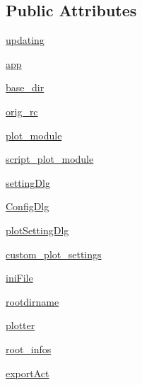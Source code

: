 \subsection*{Public Attributes}
\begin{DoxyCompactItemize}
\item 
\mbox{\hyperlink{classgetdist_1_1gui_1_1mainwindow_1_1MainWindow_aae95c1cdc2de48443e12249c96d75f23}{updating}}
\item 
\mbox{\hyperlink{classgetdist_1_1gui_1_1mainwindow_1_1MainWindow_a4d3a1d8d893ed8672986474f79ec7ed3}{app}}
\item 
\mbox{\hyperlink{classgetdist_1_1gui_1_1mainwindow_1_1MainWindow_a6ebfb6aab05c9138ae69b241cdb33e34}{base\+\_\+dir}}
\item 
\mbox{\hyperlink{classgetdist_1_1gui_1_1mainwindow_1_1MainWindow_aefc8a3ecef1f72721faba9e7bdeade71}{orig\+\_\+rc}}
\item 
\mbox{\hyperlink{classgetdist_1_1gui_1_1mainwindow_1_1MainWindow_ac741e8c4edb304ebe5892f4841195166}{plot\+\_\+module}}
\item 
\mbox{\hyperlink{classgetdist_1_1gui_1_1mainwindow_1_1MainWindow_af1f0b2e2377b627ed42c0a56e2b3402e}{script\+\_\+plot\+\_\+module}}
\item 
\mbox{\hyperlink{classgetdist_1_1gui_1_1mainwindow_1_1MainWindow_ad37f81ecb631e148123a0b91a800295d}{setting\+Dlg}}
\item 
\mbox{\hyperlink{classgetdist_1_1gui_1_1mainwindow_1_1MainWindow_affdaca3f959333cbd136f1eaf0d5e7ef}{Config\+Dlg}}
\item 
\mbox{\hyperlink{classgetdist_1_1gui_1_1mainwindow_1_1MainWindow_a63b8f8a93a82316fa3c3efc777d7a1eb}{plot\+Setting\+Dlg}}
\item 
\mbox{\hyperlink{classgetdist_1_1gui_1_1mainwindow_1_1MainWindow_af228d5b584d04944ccb743c90a8a072a}{custom\+\_\+plot\+\_\+settings}}
\item 
\mbox{\hyperlink{classgetdist_1_1gui_1_1mainwindow_1_1MainWindow_a9819f9af26e32ef151e9ad8ef5aa884f}{ini\+File}}
\item 
\mbox{\hyperlink{classgetdist_1_1gui_1_1mainwindow_1_1MainWindow_a3b2e82b7e1d40c184b7a1c0e385980e0}{rootdirname}}
\item 
\mbox{\hyperlink{classgetdist_1_1gui_1_1mainwindow_1_1MainWindow_a620647b2d7bc4f315dd567c2e02fbbb2}{plotter}}
\item 
\mbox{\hyperlink{classgetdist_1_1gui_1_1mainwindow_1_1MainWindow_a5b7f2ead42ef493720430150a6bcba40}{root\+\_\+infos}}
\item 
\mbox{\hyperlink{classgetdist_1_1gui_1_1mainwindow_1_1MainWindow_a973c38e56f9de9d62f1d1833a4cba9b5}{export\+Act}}

\end{DoxyCompactItemize}
